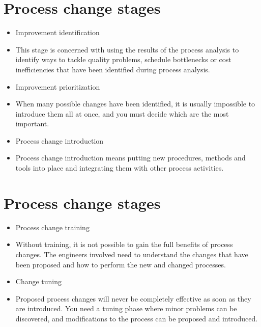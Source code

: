 \section{Process change stages}
\begin{itemize}

\item Improvement identification

   \item This stage is concerned with using the results of the process analysis to identify ways to tackle quality problems, schedule bottlenecks or cost inefficiencies that have been identified during process analysis.

\item Improvement prioritization

   \item When many possible changes have been identified, it is usually impossible to introduce them all at once, and you must decide which are the most important.

\item Process change introduction

   \item Process change introduction means putting new procedures, methods and tools into place and integrating them with other process activities.
\end{itemize}

\section{Process change stages}
\begin{itemize}

\item Process change training

   \item Without training, it is not possible to gain the full benefits of process changes. The engineers involved need to understand the changes that have been proposed and how to perform the new and changed processes.

\item Change tuning

   \item Proposed process changes will never be completely effective as soon as they are introduced. You need a tuning phase where minor problems can be discovered, and modifications to the process can be proposed and introduced.


\end{itemize}

